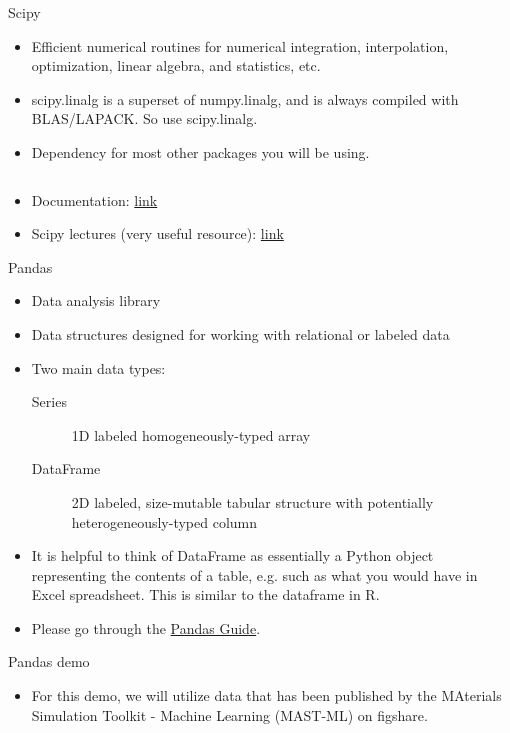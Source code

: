 \documentclass[aspectratio=169]{beamer}
\begin{document}
    \begin{frame}[fragile]{Scipy}
        \begin{itemize}
            \item Efficient numerical routines for numerical integration, interpolation, optimization, linear algebra, and statistics, etc.
            \item scipy.linalg is a superset of numpy.linalg, and is always compiled with BLAS/LAPACK. So use scipy.linalg.
            \item Dependency for most other packages you will be using.
            \inputminted{python}{example_scipy.py}
            \item Documentation: \href{http://docs.scipy.org/doc/scipy/}{link}
            \item Scipy lectures (very useful resource): \href{https://scipy-lectures.org/}{link}
        \end{itemize}
    \end{frame}


    \begin{frame}{Pandas}
        \begin{itemize}
            \item Data analysis library
            \item Data structures designed for working with relational or labeled data
            \item Two main data types:
            \begin{description}
                \item[Series] 1D labeled homogeneously-typed array
                \item[DataFrame] 2D labeled, size-mutable tabular structure with potentially heterogeneously-typed column
            \end{description}
            \item It is helpful to think of DataFrame as essentially a Python object representing the contents of a table, e.g. such as what you would have in Excel spreadsheet. This is similar to the dataframe in R.
            \item Please go through the \href{http://pandas.pydata.org/docs/user_guide/index.html}{Pandas Guide}.
        \end{itemize}
    \end{frame}


    \begin{frame}[fragile]{Pandas demo}
        \begin{itemize}
            \item For this demo, we will utilize data that has been published by the MAterials Simulation Toolkit - Machine Learning (MAST-ML) on figshare.
        \end{itemize}
        \inputminted{python}{example_pandas.py}
    \end{frame}
\end{document}
